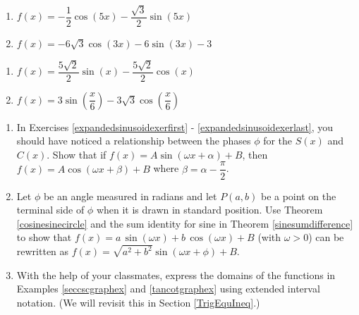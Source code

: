 \begin{multicols}{2}

\begin{enumerate}

\setcounter{enumi}{\value{HW}}

\item  $f(x) = -\dfrac{1}{2} \cos(5x) -\dfrac{\sqrt{3}}{2} \sin(5x)$
\item  $f(x) = -6\sqrt{3} \cos(3x) - 6\sin(3x) - 3$  

\setcounter{HW}{\value{enumi}}

\end{enumerate}

\end{multicols}

\begin{multicols}{2}

\begin{enumerate}

\setcounter{enumi}{\value{HW}}

\item  $f(x) =  \dfrac{5\sqrt{2}}{2} \sin(x)  -\dfrac{5\sqrt{2}}{2} \cos(x)$
\item  $f(x) =3 \sin \left(\dfrac{x}{6}\right) -3\sqrt{3} \cos \left(\dfrac{x}{6}\right)$   \label{expandedsinusoidexerlast}

\setcounter{HW}{\value{enumi}}

\end{enumerate}

\end{multicols}

\begin{enumerate}

\setcounter{enumi}{\value{HW}}

\item In Exercises \ref{expandedsinusoidexerfirst} - \ref{expandedsinusoidexerlast}, you should have noticed a relationship between the phases $\phi$ for the $S(x)$ and $C(x)$.  Show that if $f(x) = A \sin(\omega x + \alpha) + B$, then $f(x) = A \cos(\omega x + \beta) + B$ where $\beta = \alpha - \dfrac{\pi}{2}$. 
\label{sinusoidexercise1}

\item Let $\phi$ be an angle measured in radians and let $P(a,b)$ be a point on the terminal side of $\phi$ when it is drawn in standard position.  Use Theorem \ref{cosinesinecircle} and the sum identity for sine in Theorem \ref{sinesumdifference} to show that  $f(x) = a \, \sin(\omega x) + b\, \cos(\omega x) + B$ (with  $\omega > 0$) can be rewritten as $f(x) = \sqrt{a^{2} + b^{2}}\sin(\omega x + \phi) + B$.
\label{sinusoidexercise2}

\item  With the help of your classmates, express the domains of the functions in Examples \ref{seccscgraphex} and \ref{tancotgraphex} using extended interval notation. (We will revisit this in Section \ref{TrigEquIneq}.)  

\setcounter{HW}{\value{enumi}}

\end{enumerate}

